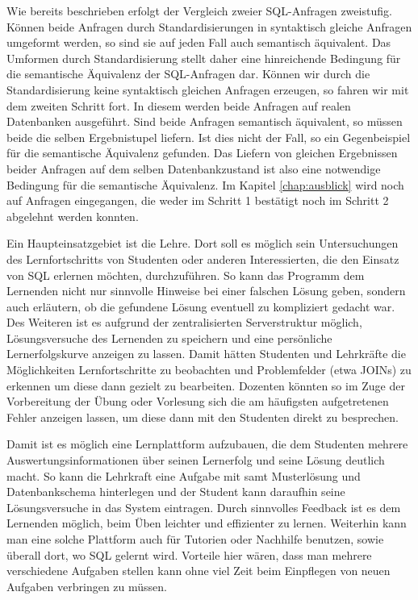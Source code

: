 Wie bereits beschrieben erfolgt der Vergleich zweier SQL-Anfragen zweistufig. Können beide Anfragen durch Standardisierungen in syntaktisch gleiche Anfragen umgeformt werden, so sind sie auf jeden Fall auch semantisch äquivalent. Das Umformen durch Standardisierung stellt daher eine hinreichende Bedingung für die semantische Äquivalenz der SQL-Anfragen dar. Können wir durch die Standardisierung keine syntaktisch gleichen Anfragen erzeugen, so fahren wir mit dem zweiten Schritt fort. In diesem werden beide Anfragen auf realen Datenbanken ausgeführt. Sind beide Anfragen semantisch äquivalent, so müssen beide die selben Ergebnistupel liefern. Ist dies nicht der Fall, so ein Gegenbeispiel für die semantische Äquivalenz gefunden. Das Liefern von gleichen Ergebnissen beider Anfragen auf dem selben Datenbankzustand ist also eine notwendige Bedingung für die semantische Äquivalenz. Im Kapitel \ref{chap:ausblick} wird noch auf Anfragen eingegangen, die weder im Schritt 1 bestätigt noch im Schritt 2 abgelehnt werden konnten. 


Ein Haupteinsatzgebiet ist die Lehre. Dort soll es möglich sein Untersuchungen des Lernfortschritts von Studenten oder anderen Interessierten, die den Einsatz von SQL erlernen möchten, durchzuführen. So kann das Programm dem Lernenden nicht nur sinnvolle Hinweise bei einer falschen Lösung geben, sondern auch erläutern, ob die gefundene Lösung eventuell zu kompliziert gedacht war. Des Weiteren ist es aufgrund der zentralisierten Serverstruktur möglich, Lösungsversuche des Lernenden zu speichern und eine persönliche Lernerfolgskurve anzeigen zu lassen. Damit hätten Studenten und Lehrkräfte die Möglichkeiten Lernfortschritte zu beobachten und Problemfelder (etwa JOINs) zu erkennen um diese dann gezielt zu bearbeiten. Dozenten könnten so im Zuge der Vorbereitung der Übung oder Vorlesung sich die am häufigsten aufgetretenen Fehler anzeigen lassen, um diese dann mit den Studenten direkt zu besprechen.

Damit ist es möglich eine Lernplattform aufzubauen, die dem Studenten mehrere Auswertungsinformationen über seinen Lernerfolg und seine Lösung deutlich macht. So kann die Lehrkraft eine Aufgabe mit samt Musterlösung und Datenbankschema hinterlegen und der Student kann daraufhin seine Lösungsversuche in das System eintragen. Durch sinnvolles Feedback ist es dem Lernenden möglich, beim Üben leichter und effizienter zu lernen. Weiterhin kann man eine solche Plattform auch für Tutorien oder Nachhilfe benutzen, sowie überall dort, wo SQL gelernt wird. Vorteile hier wären, dass man mehrere verschiedene Aufgaben stellen kann ohne viel Zeit beim Einpflegen von neuen Aufgaben verbringen zu müssen.

